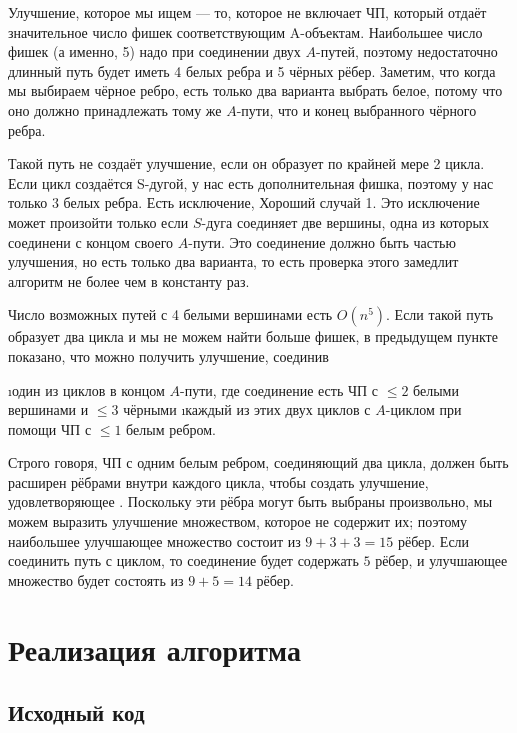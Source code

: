 \begin{proofstar}
Улучшение, которое мы ищем --- то, которое не включает ЧП, который отдаёт значительное число фишек соответствующим A-объектам. Наибольшее число фишек (а именно, 5) надо при соединении двух $A$-путей, поэтому недостаточно длинный путь будет иметь 4 белых ребра и 5 чёрных рёбер. Заметим, что  когда мы выбираем чёрное ребро, есть только два варианта выбрать белое, потому что оно должно принадлежать тому же $A$-пути, что и конец выбранного чёрного ребра.

Такой путь не создаёт улучшение, если он образует по крайней мере 2 цикла. Если цикл создаётся S-дугой, у нас есть дополнительная фишка, поэтому у нас только $3$ белых ребра. Есть исключение, Хороший случай 1. Это исключение может произойти только если $S$-дуга соединяет две вершины, одна из которых соединени с концом своего $A$-пути. Это соединение должно быть частью улучшения, но есть только два варианта, то есть проверка этого замедлит алгоритм не более чем в константу раз.

Число возможных путей с 4 белыми вершинами есть $O(n^5)$. Если такой путь образует два цикла и мы не можем найти больше фишек, в предыдущем пункте показано, что можно получить улучшение, соединив 
\begin{enumerate}
\i один из циклов в концом $A$-пути, где соединение есть ЧП с $\le 2$ белыми вершинами и $\le 3$ чёрными
\i каждый из этих двух циклов с $A$-циклом при помощи ЧП с $\le 1$ белым ребром.
\end{enumerate}

Строго говоря, ЧП с одним белым ребром, соединяющий два цикла, должен быть расширен рёбрами внутри каждого цикла, чтобы создать улучшение, удовлетворяющее . Поскольку эти рёбра могут быть выбраны произвольно, мы можем выразить улучшение множеством, которое не содержит их; поэтому наибольшее улучшающее множество состоит из $9+3+3=15$ рёбер. Если соединить путь с циклом, то соединение будет содержать $5$ рёбер, и улучшающее множество будет состоять из $9+5=14$ рёбер.

\end{proofstar}

\section{Реализация алгоритма}

\subsection{Исходный код}
\inputminted{python}{k-improv.py}
